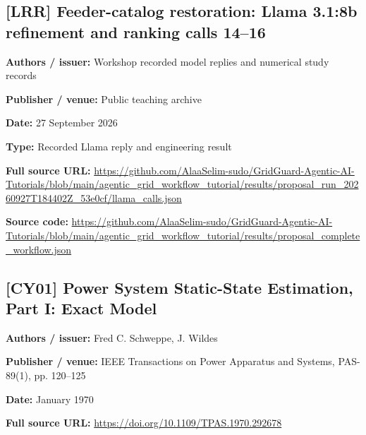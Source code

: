 \documentclass[10pt,letterpaper]{article}
\begin{document}
\subsection*{[LRR] Feeder-catalog restoration: Llama 3.1:8b refinement and ranking calls 14--16}
\textbf{Authors / issuer:} Workshop recorded model replies and numerical study records\par
\textbf{Publisher / venue:} Public teaching archive\par
\textbf{Date:} 27 September 2026\par
\textbf{Type:} Recorded Llama reply and engineering result\par
\textbf{Full source URL:} \href{https://github.com/AlaaSelim-sudo/GridGuard-Agentic-AI-Tutorials/blob/main/agentic_grid_workflow_tutorial/results/proposal_run_20260927T184402Z_53e0cf/llama_calls.json}{\small\ttfamily https:/\allowbreak{}/\allowbreak{}github.\allowbreak{}com/\allowbreak{}AlaaSelim-\allowbreak{}sudo/\allowbreak{}GridGuard-\allowbreak{}Agentic-\allowbreak{}AI-\allowbreak{}Tutorials/\allowbreak{}blob/\allowbreak{}main/\allowbreak{}agentic\_\allowbreak{}grid\_\allowbreak{}workflow\_\allowbreak{}tutorial/\allowbreak{}results/\allowbreak{}proposal\_\allowbreak{}run\_\allowbreak{}20260927T184402Z\_\allowbreak{}53e0cf/\allowbreak{}llama\_\allowbreak{}calls.\allowbreak{}json}\par
\textbf{Source code:} \href{https://github.com/AlaaSelim-sudo/GridGuard-Agentic-AI-Tutorials/blob/main/agentic_grid_workflow_tutorial/results/proposal_complete_workflow.json}{\small\ttfamily https:/\allowbreak{}/\allowbreak{}github.\allowbreak{}com/\allowbreak{}AlaaSelim-\allowbreak{}sudo/\allowbreak{}GridGuard-\allowbreak{}Agentic-\allowbreak{}AI-\allowbreak{}Tutorials/\allowbreak{}blob/\allowbreak{}main/\allowbreak{}agentic\_\allowbreak{}grid\_\allowbreak{}workflow\_\allowbreak{}tutorial/\allowbreak{}results/\allowbreak{}proposal\_\allowbreak{}complete\_\allowbreak{}workflow.\allowbreak{}json}\par
\par\medskip
\subsection*{[CY01] Power System Static-State Estimation, Part I: Exact Model}
\textbf{Authors / issuer:} Fred C. Schweppe, J. Wildes\par
\textbf{Publisher / venue:} IEEE Transactions on Power Apparatus and Systems, PAS-89(1), pp. 120--125\par
\textbf{Date:} January 1970\par
\textbf{Full source URL:} \href{https://doi.org/10.1109/TPAS.1970.292678}{\small\ttfamily https:/\allowbreak{}/\allowbreak{}doi.\allowbreak{}org/\allowbreak{}10.\allowbreak{}1109/\allowbreak{}TPAS.\allowbreak{}1970.\allowbreak{}292678}\par
\par\medskip
\end{document}
